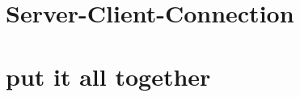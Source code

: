 

\section{Server-Client-Connection}\label{sec:serverclient}





\section{put it all together}\label{sec:ka}







